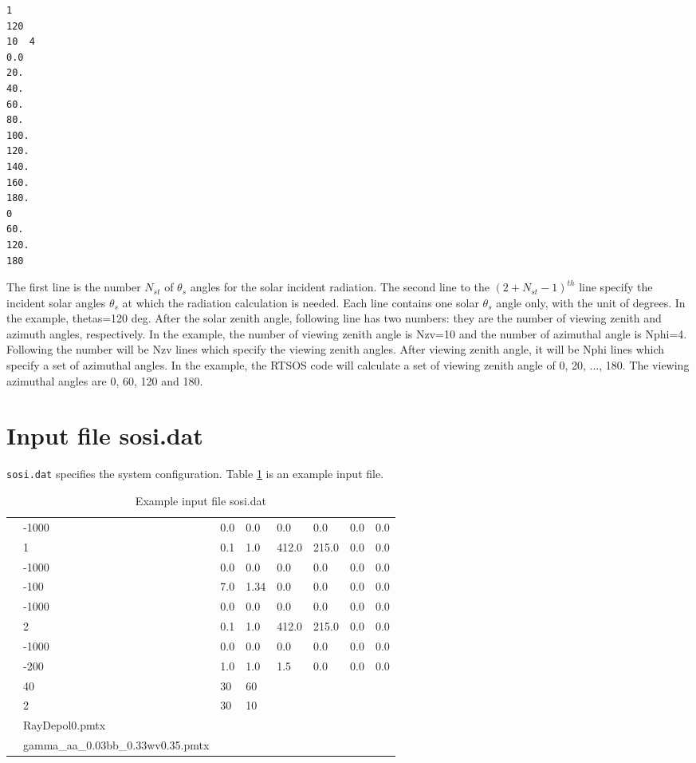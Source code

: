 \documentclass[10pt,letterpaper]{article}
\begin{document}
\begin{verbatim}
1
120
10  4
0.0
20.
40.
60.
80.
100.
120.
140.
160.
180. 
0
60.
120.
180
\end{verbatim}

The first line is the number $N_{st}$ of $\theta_{s}$ angles for the solar incident radiation.  The second line to the ${(2+N_{st}-1)}^{th}$ line specify the incident solar angles $\theta_{s}$ at which the radiation calculation is needed.  Each line contains one solar $\theta_{s}$ angle only, with the unit of degrees.  In the example, thetas=120 deg. After the solar zenith angle, following line has two numbers: they are the number of viewing zenith and azimuth angles, respectively.  In the example, the number of viewing zenith angle is Nzv=10 and the number of azimuthal angle is Nphi=4.  Following the number will be Nzv lines which specify the viewing zenith angles.  After viewing zenith angle, it will be Nphi lines which specify a set of azimuthal angles. In the example, the RTSOS code will calculate a set of viewing zenith angle of 0, 20, ..., 180.  The viewing azimuthal angles are 0, 60, 120 and 180.

\section{Input file sosi.dat}
\verb"sosi.dat" specifies the system configuration.  Table \ref{tab:sosi} is an example input file.
\begin{table}
\caption{Example input file sosi.dat}
\vspace{0.2 in}
\centering
\begin{tabular}{llllllll}
&-1000 &  0.0  & 0.0   &  0.0   &  0.0    & 0.0   & 0.0   \\
&1        &  0.1  & 1.0   & 412.0& 215.0 & 0.0   & 0.0   \\
&-1000 &  0.0  & 0.0   &  0.0   &  0.0    & 0.0   & 0.0   \\
&-100   &  7.0  & 1.34 &  0.0   &   0.0   & 0.0   & 0.0   \\
&-1000 &  0.0  & 0.0   &   0.0  &  0.0    & 0.0   & 0.0   \\
&2        &  0.1  & 1.0   & 412.0& 215.0 & 0.0   & 0.0   \\
&-1000 &  0.0  & 0.0   &   0.0  & 0.0     & 0.0   & 0.0   \\
&-200   &  1.0  & 1.0   &   1.5  &  0.0    & 0.0   & 0.0   \\
&40      &  30   & 60    &          &           &         &         \\
&2        &  30     & 10      &          &           &         &         \\
&RayDepol0.pmtx        &        &           & &     &     &               \\
&gamma\_aa\_0.03bb\_0.33wv0.35.pmtx    &       &    & &         &      &         \\
\end{tabular}
\label{tab:sosi}
\end{table}
\end{document}
